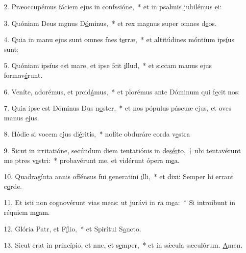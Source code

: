 2. Præoccupémus fáciem ejus in confssi\uline{ó}ne,~* et in psalmis jubilémus \uline{e}i:\par 
3. Quóniam Deus mgnus D\uline{ó}minus,~* et rex magnus super omnes d\uline{e}os.\par 
4. Quia in manu ejus sunt omnes fnes t\uline{e}rræ,~* et altitúdines móntium ips\uline{í}us sunt;\par 
5. Quóniam ipsíus est mare, et ipse fcit \uline{i}llud,~* et siccam manus ejus formav\uline{é}runt.\par 
6. Veníte, adorémus, et prcid\uline{á}mus,~* et plorémus ante Dóminum qui f\uline{e}cit nos:\par 
7. Quia ipse est Dóminus Dus n\uline{o}ster,~* et nos pópulus páscuæ ejus, et oves manus \uline{e}jus.\par 
8. Hódie si vocem ejus di\uline{é}ritis,~* nolíte obduráre corda v\uline{e}stra\par 
9. Sicut in irritatióne, secúndum diem tentatiónis in de\uline{sér}to,~† ubi tentavérunt me ptres v\uline{e}stri:~* probavérunt me, et vidérunt ópera m\uline{e}a.\par 
10. Quadragínta annis offénsus fui generatini \uline{i}lli,~* et dixi: Semper hi errant c\uline{o}rde.\par 
11. Et isti non cognovérunt vias meas: ut jurávi in ra m\uline{e}a:~* Si introíbunt in réquiem m\uline{e}am.\par 
12. Glória Patr, et F\uline{í}lio,~* et Spirítui S\uline{a}ncto.\par 
13. Sicut erat in princípio, et nnc, et s\uline{e}mper,~* et in sǽcula sæculórum. \uline{A}men.\par 
